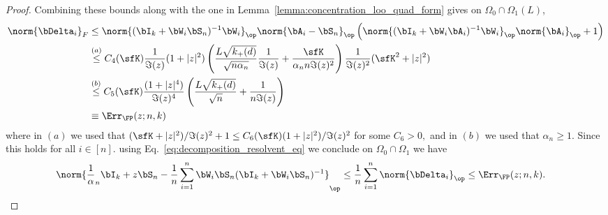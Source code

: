 \begin{proof}
Combining these bounds along with the one in Lemma~\ref{lemma:concentration_loo_quad_form} gives on $\Omega_0 \cap\Omega_1(L)$,
\begin{align*}
    \norm{\bDelta_i}_F
  &\le\norm{(\bI_k + \bW_i \bS_n)^{-1}\bW_i}_\op \norm{\bA_i -\bS_n}_\op \left(\norm{(\bI_k + \bW_i \bA_i)^{-1}\bW_i}_\op\norm{\bA_i}_\op + 1\right)
   \\ 
  &\stackrel{(a)}{\le}
  C_4(\sfK) \frac{1}{\Im(z)} (1 + |z|^2) 
\left( \frac{L\sqrt{ k_+(d)} }{\sqrt{n\alpha_n}} \frac1{\Im(z)} 
   +  \frac{\sfK}{\alpha_n n \Im(z)^2}\right)
   \frac{1}{\Im(z)^2}(\sfK^2 + |z|^2)
  \\
  &\stackrel{(b)}{\le} 
  C_5(\sfK) \frac{(1+|z|^4)}{\Im(z)^4} 
\left( \frac{L \sqrt{k_+(d)} }{\sqrt{n}}  
   +  \frac{1}{ n \Im(z)}\right)\\
   &\equiv \Err_{\FP}(z; n, k)
\end{align*}
where in $(a)$ we used that $(\sfK + |z|^2)/\Im(z)^2+1 \le C_6(\sfK) (1+ |z|^2)/\Im(z)^2$ for some $C_6>0,$ and in $(b)$ we used that $\alpha_n \ge 1.$
%
Since this holds for all $i\in[n]$. using Eq.~\eqref{eq:decomposition_resolvent_eq} we conclude
on $\Omega_0\cap\Omega_1$ we have
\begin{align}
\nonumber
&\norm{\frac1\alpha_n\bI_k + z \bS_n - \frac1n \sum_{i=1}^n\bW_i \bS_n(\bI_k + \bW_i \bS_n)^{-1} }_\op
\le
 \frac1n\sum_{i=1}^n \norm{\bDelta_i}_\op\le 
\Err_{\FP}(z;n,k).
\end{align}
\end{proof}




